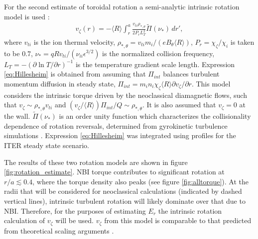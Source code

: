 \documentclass{article}
\begin{document}
For the second estimate of toroidal rotation a semi-analytic intrinsic rotation model is used \cite{Hillesheim2015}:
\begin{gather}
v_{\zeta}(r) = - \langle R \rangle \int_{r}^a \frac{v_{ti} \rho_{*,\theta}} {2 P_r L_T^2} \widetilde{\Pi} (\nu_*) \, d r',
\end{gather} \label{eq:Hillesheim}
where $v_{ti}$ is the ion thermal velocity, $\rho_{*,\theta} = v_{ti} m_i/(e B_{\theta} \langle R \rangle) $, $P_r = \chi_{\zeta}/\chi_i$ is taken to be 0.7, $\nu_* = q R v_{ti}/(\nu_{ii} \epsilon^{3/2})$ is the normalized collision frequency, $L_T = - \left( \partial \ln T/ \partial r \right)^{-1}$ is the temperature gradient scale length. Expression \ref{eq:Hillesheim} is obtained from assuming that $\Pi_{int}$ balances turbulent momentum diffusion in steady state, $\Pi_{int} = m_i n_i \chi_{\zeta} \langle R \rangle \partial v_{\zeta}/\partial r$. This model considers the intrinsic torque driven by the neoclassical diamagnetic flows, such that $v_{\zeta} \sim \rho_{*,\theta} v_{ti}$ and $(v_{\zeta}/\langle R \rangle) \Pi_{int}/Q \sim \rho_{*, \theta}$. It is also assumed that $v_{\zeta} = 0$ at the wall. %
$\widetilde{\Pi} (\nu_*)$ is an order unity function which characterizes the collisionality dependence of rotation reversals, determined from gyrokinetic turbulence simulations \cite{Barnes2013}. Expression \ref{eq:Hillesheim} was integrated using profiles for the ITER steady state scenario.

The results of these two rotation models are shown in figure \ref{fig:rotation_estimate}. NBI torque contributes to significant rotation at $r/a \lesssim 0.4$, where the torque density also peaks (see figure \ref{fig:alltorque}).  At the radii that will be considered for neoclassical calculations (indicated by dashed vertical lines), intrinsic turbulent rotation will likely dominate over that due to NBI. Therefore, for the purposes of estimating $E_r$ the intrinsic rotation calculation of $v_{\zeta}$ will be used. $v_{\zeta}$ from this model is comparable to that predicted from theoretical scaling arguments \cite{Parra2012}.

\FloatBarrier
\end{document}
